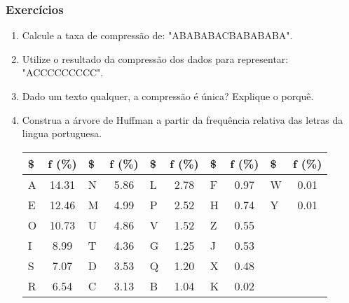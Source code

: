 \documentclass[10pt]{beamer}
\begin{document}
\begin{frame}[t]
    \frametitle{Exercícios}
    \begin{enumerate}[label=\textcircled{\scriptsize\arabic*}]
        \item Calcule a taxa de compressão de: "ABABABACBABABABA".
        \item Utilize o resultado da compressão dos dados para representar: "ACCCCCCCCC".
        \item Dado um texto qualquer, a compressão é única? Explique o porquê.
        \item Construa a árvore de Huffman a partir da frequência relativa das letras da lingua portuguesa.

              \begin{table}[htbp]
                  \centering

                  \begin{tabular}{lc|lc|lc|lc|lc}
                      \toprule
                      \textbf{\$} & \textbf{f (\%)} & \textbf{\$} & \textbf{f (\%)} & \textbf{\$} & \textbf{f (\%)} & \textbf{\$} & \textbf{f (\%)} & \textbf{\$} & \textbf{f (\%)} \\
                      \midrule
                      A           & 14.31           & N           & 5.86            & L           & 2.78            & F           & 0.97            & W           & 0.01            \\
                      E           & 12.46           & M           & 4.99            & P           & 2.52            & H           & 0.74            & Y           & 0.01            \\
                      O           & 10.73           & U           & 4.86            & V           & 1.52            & Z           & 0.55            &             &                 \\
                      I           & 8.99            & T           & 4.36            & G           & 1.25            & J           & 0.53            &             &                 \\
                      S           & 7.07            & D           & 3.53            & Q           & 1.20            & X           & 0.48            &             &                 \\
                      R           & 6.54            & C           & 3.13            & B           & 1.04            & K           & 0.02            &             &                 \\
                      \bottomrule
                  \end{tabular}
              \end{table}
    \end{enumerate}
\end{frame}
\end{document}
